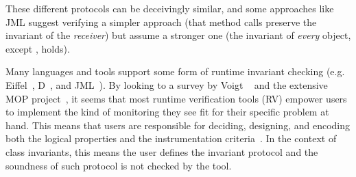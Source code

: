 \noindent These different protocols can be deceivingly similar, and 
some approaches like JML suggest verifying a simpler approach (that method calls preserve the invariant of the \emph{receiver}) but assume a stronger one (the invariant of \emph{every} object, except \Q@this@, holds).






\newcommand\sepItems{\saveSpace\saveSpace\saveSpace\\*${}_{}$\\*${}_{}\,\bullet\,$}

Many languages and tools support some form of runtime invariant checking (e.g. Eiffel~\cite{Meyer:1992:EL:129093}, D~\cite{Alexandrescu:2010:DPL:1875434},
and JML~\cite{Burdy2005}).
By looking to a survey by Voigt \etal~\cite{Voigt2013} and the extensive MOP project~\cite{meredith2012overview},
it seems that most runtime verification tools (RV) empower users
to implement the kind of monitoring they see fit for their specific problem at hand. This means that users are responsible for deciding, designing, and encoding both the logical properties and the instrumentation criteria~\cite{meredith2012overview}.
In the context of class invariants, this means the user defines the invariant protocol and the soundness of such protocol is not checked by the tool.

